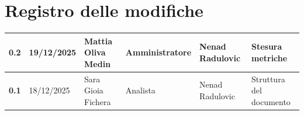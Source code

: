 \documentclass[a4paper,12pt]{article}
\begin{document}
    

    \section*{Registro delle modifiche} {
        \begin{table}[h!]
                \begin{tabularx}{\textwidth}{|l|l|l|l|L|L|}
                \hline
                \textbf{0.2} & 19/12/2025 & Mattia Oliva Medin & Amministratore & Nenad Radulovic & Stesura metriche\\
                \hline
                \textbf{0.1} & 18/12/2025 & Sara Gioia Fichera & Analista & Nenad Radulovic & Struttura del documento \\
                \hline
            \end{tabularx}
        \end{table}
    }
    \newpage
    
    \tableofcontents
    \newpage

    \listoftables
    \newpage

    \listoffigures
    \newpage
    
\end{document}
